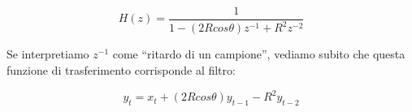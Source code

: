 		 \begin{equation}
			 H(z) = \frac{1}{1 - (2R cos \theta) z^{-1} + R^{2} z^{-2}}
		 \end{equation}
  
   
	Se interpretiamo $z^{-1}$ come ``ritardo di un campione'', vediamo subito che
    questa funzione di trasferimento corrisponde al filtro:
  
		 \begin{equation}
    y_t = x_t + (2Rcos \theta) y_{t-1} - R^{2} y_{t-2}
		 \end{equation}
  
% 
%    
% 
%    
%    
%    
%    
%    
%    
%    


